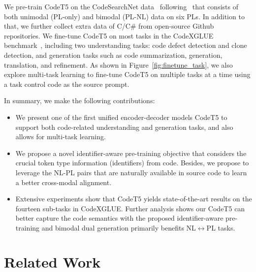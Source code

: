 \documentclass[11pt]{article}
\begin{document}
We pre-train CodeT5 on the CodeSearchNet data~\cite{DBLP:journals/corr/abs-1909-09436} following~\cite{DBLP:conf/emnlp/FengGTDFGS0LJZ20} that consists of both unimodal (PL-only) and bimodal (PL-NL) data on six PLs. 
In addition to that, we further collect extra data of C/C\# from open-source Github repositories. 
We fine-tune CodeT5 on most tasks in the CodeXGLUE benchmark~\cite{DBLP:journals/corr/abs-2102-04664}, including two understanding tasks: code defect detection and clone detection, and generation tasks such as code summarization,  generation, translation, and refinement. 
As shown in Figure~\ref{fig:finetune_task},
we also explore multi-task learning to fine-tune CodeT5 on multiple tasks at a time using a task control code as the source prompt.


\noindent In summary, we make the following contributions: 
\begin{itemize}
\vspace{-0.5em}
\itemsep0em
    \item We present one of the first unified encoder-decoder models CodeT5 to support both code-related understanding and generation tasks, and also   allows for multi-task learning. 
    \item We propose a novel identifier-aware pre-training objective that considers the crucial token type information (identifiers) from code. Besides, we propose to leverage the NL-PL pairs that are naturally available in source code to learn a better cross-modal alignment.
    \item 
    Extensive experiments show that CodeT5 yields state-of-the-art results on the fourteen sub-tasks in CodeXGLUE. Further analysis shows our CodeT5 can better capture the code semantics with the proposed identifier-aware pre-training and bimodal dual generation primarily benefits NL$\leftrightarrow$PL tasks.
\end{itemize} \section{Related Work}
\end{document}
